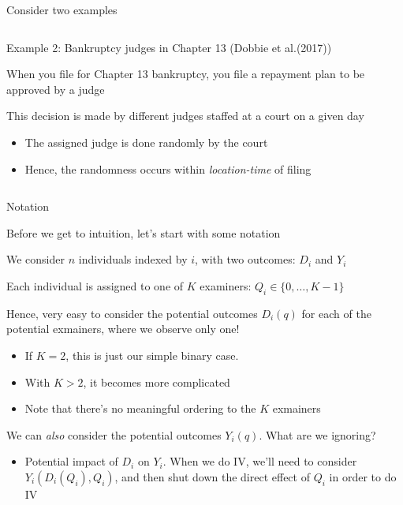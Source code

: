 \documentclass[notes,11pt, aspectratio=169]{beamer}
\newenvironment{wideitemize}{\itemize\addtolength{\itemsep}{10pt}}{\enditemize}
\begin{document}
\begin{frame}{Consider two examples}
  \begin{columns}[onlytextwidth, T] %
    \begin{column}{.50\textwidth}
      \begin{wideitemize}
      \item Example 2: Bankruptcy judges in Chapter 13 (Dobbie et al.(2017))
      \item When you file for Chapter 13 bankruptcy, you file a
        repayment plan to be approved by a judge
      \item This decision is made by different judges staffed at a
        court on a given day
        \begin{itemize}
        \item The assigned judge is done randomly by the court
        \item Hence, the randomness occurs within \emph{location-time}
          of filing
        \end{itemize}
      \end{wideitemize}
    \end{column}%
    \hfill%
    \begin{column}{.5\textwidth}
    \end{column}%
  \end{columns}
\end{frame}

\begin{frame}{Notation}
  \begin{wideitemize}
  \item Before we get to intuition, let's start with some notation
  \item We consider $n$ individuals indexed by $i$, with two outcomes: $D_{i}$  and $Y_{i}$
  \item Each individual is assigned to one of $K$ examiners: $Q_{i} \in \{0, \ldots, K-1\}$
  \item Hence, very easy to consider the potential outcomes $D_{i}(q)$
    for each of the potential exmainers, where we observe only one!
    \begin{itemize}
    \item If $K=2$, this is just our simple binary case.
    \item With  $K > 2$, it becomes more complicated
    \item Note that there's no meaningful ordering to the $K$ exmainers 
    \end{itemize}
  \item We can \emph{also} consider the potential outcomes $Y_{i}(q)$. What are we ignoring?
    \pause
    \begin{itemize}
    \item Potential impact of $D_{i}$ on $Y_{i}$. When we do IV, we'll
      need to consider $Y_{i}(D_{i}(Q_{i}), Q_{i})$, and then shut
      down the direct effect of $Q_{i}$ in order to do IV
    \end{itemize}
  \end{wideitemize}
\end{frame}
\end{document}
